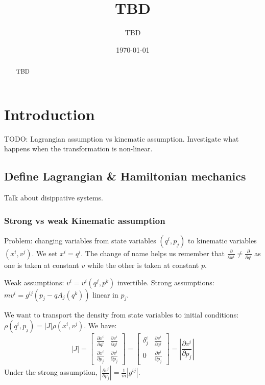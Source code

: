 \documentclass[letterpaper]{article}
\begin{document}

\title{TBD}
\author{TBD}

\date{\today}

\maketitle

\begin{abstract}
	TBD
\end{abstract}


\section{Introduction}


TODO: Lagrangian assumption vs kinematic assumption. Investigate what happens when the transformation is non-linear.

\subsection{Define Lagrangian \& Hamiltonian mechanics}

Talk about disippative systems.

\subsubsection{Strong vs weak Kinematic assumption}

Problem: changing variables from state variables $(q^i, p_j)$ to kinematic variables $(x^i, v^j)$. We set $x^i=q^i$. The change of name helps us remember that $\frac{\partial}{\partial x^i} \neq \frac{\partial}{\partial q^i}$ as one is taken at constant $v$ while the other is taken at constant $p$.

Weak assumptions: $v^i = v^i(q^j, p^k)$ invertible. Strong assumptions: $m v^i = g^{ij} (p_j - q A_j(q^k))$ linear in $p_j$.

We want to transport the density from state variables to initial conditions: $\rho(q^i, p_j) = |J| \rho(x^i, v^j)$. We have:
\begin{equation}
	|J| = \begin{bmatrix}
	\frac{\partial x^i}{\partial q^j} & \frac{\partial v^i}{\partial q^j} \\
	\frac{\partial x^i}{\partial p_j} & \frac{\partial v^i}{\partial p_j}
	\end{bmatrix}
	= \begin{bmatrix}
	\delta^i_j & \frac{\partial v^i}{\partial q^j} \\
	0 & \frac{\partial v^i}{\partial p_j}
	\end{bmatrix}
	= \left|\frac{\partial v^i}{\partial p_j}\right|
\end{equation}
Under the strong assumption, $\left|\frac{\partial v^i}{\partial p_j}\right| = \frac{1}{m} |g^{ij}|$.
\end{document}
